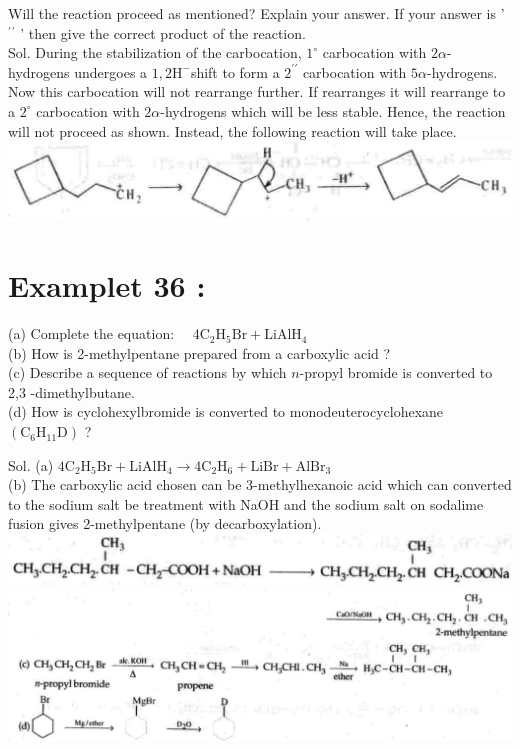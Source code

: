 \documentclass[10pt]{article}
\begin{document}
Will the reaction proceed as mentioned? Explain your answer. If your answer is ' ${ }^{\prime}{ }^{\prime}$ ' then give the correct product of the reaction.\\
Sol. During the stabilization of the carbocation, $1^{\circ}$ carbocation with $2 \alpha$-hydrogens undergoes a $1,2 \mathrm{H}^{-}$shift to form a $2^{\prime \prime}$ carbocation with $5 \alpha$-hydrogens. Now this carbocation will not rearrange further. If rearranges it will rearrange to a $2^{\circ}$ carbocation with $2 \alpha$-hydrogens which will be less stable. Hence, the reaction will not proceed as shown. Instead, the following reaction will take place.\\
\includegraphics[max width=\textwidth, center]{2025_01_28_8470952b98110cec3aabg-227(3)}

\section*{Examplet 36 :}
(a) Complete the equation: $\quad 4 \mathrm{C}_{2} \mathrm{H}_{5} \mathrm{Br}+\mathrm{LiAlH}_{4}$\\
(b) How is 2-methylpentane prepared from a carboxylic acid ?\\
(c) Describe a sequence of reactions by which $n$-propyl bromide is converted to 2,3 -dimethylbutane.\\
(d) How is cyclohexylbromide is converted to monodeuterocyclohexane $\left(\mathrm{C}_{6} \mathrm{H}_{11} \mathrm{D}\right)$ ?

Sol. (a) $4 \mathrm{C}_{2} \mathrm{H}_{5} \mathrm{Br}+\mathrm{LiAlH}_{4} \longrightarrow 4 \mathrm{C}_{2} \mathrm{H}_{6}+\mathrm{LiBr}+\mathrm{AlBr}_{3}$\\
(b) The carboxylic acid chosen can be 3-methylhexanoic acid which can converted to the sodium salt be treatment with NaOH and the sodium salt on sodalime fusion gives 2-methylpentane (by decarboxylation).\\
\includegraphics[max width=\textwidth, center]{2025_01_28_8470952b98110cec3aabg-228}\\
\includegraphics[max width=\textwidth, center]{2025_01_28_8470952b98110cec3aabg-228(4)}
\end{document}
